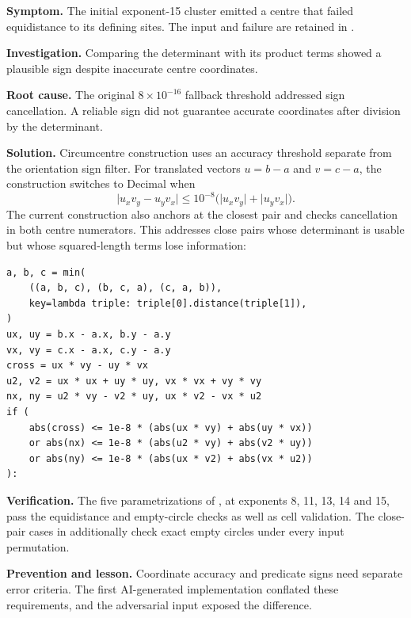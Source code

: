 \textbf{Symptom.} The initial exponent-15 cluster emitted a centre that failed equidistance to its defining sites. The input and failure are retained in .

\textbf{Investigation.} Comparing the determinant with its product terms showed a plausible sign despite inaccurate centre coordinates.

\textbf{Root cause.} The original \(8\times10^{-16}\) fallback threshold addressed sign cancellation. A reliable sign did not guarantee accurate coordinates after division by the determinant.

\textbf{Solution.} Circumcentre construction uses an accuracy threshold separate from the orientation sign filter. For translated vectors \(u=b-a\) and \(v=c-a\), the construction switches to Decimal when
\begin{equation}
  \lvert u_xv_y-u_yv_x\rvert
  \leq 10^{-8}\bigl(\lvert u_xv_y\rvert+\lvert u_yv_x\rvert\bigr).
  \label{eq:centre-filter}
\end{equation}
The current construction also anchors at the closest pair and checks cancellation in both centre numerators. This addresses close pairs whose determinant is usable but whose squared-length terms lose information:

\noindent\begin{minipage}{\linewidth}
\begin{lstlisting}[caption={Use a construction-accuracy threshold for the circumcentre.},label={lst:circumcentre-fix}]
a, b, c = min(
    ((a, b, c), (b, c, a), (c, a, b)),
    key=lambda triple: triple[0].distance(triple[1]),
)
ux, uy = b.x - a.x, b.y - a.y
vx, vy = c.x - a.x, c.y - a.y
cross = ux * vy - uy * vx
u2, v2 = ux * ux + uy * uy, vx * vx + vy * vy
nx, ny = u2 * vy - v2 * uy, ux * v2 - vx * u2
if (
    abs(cross) <= 1e-8 * (abs(ux * vy) + abs(uy * vx))
    or abs(nx) <= 1e-8 * (abs(u2 * vy) + abs(v2 * uy))
    or abs(ny) <= 1e-8 * (abs(ux * v2) + abs(vx * u2))
):
\end{lstlisting}
\end{minipage}

\textbf{Verification.} The five parametrizations of , at exponents 8, 11, 13, 14 and 15, pass the equidistance and empty-circle checks as well as cell validation. The close-pair cases in  additionally check exact empty circles under every input permutation.

\textbf{Prevention and lesson.} Coordinate accuracy and predicate signs need separate error criteria. The first AI-generated implementation conflated these requirements, and the adversarial input exposed the difference.

